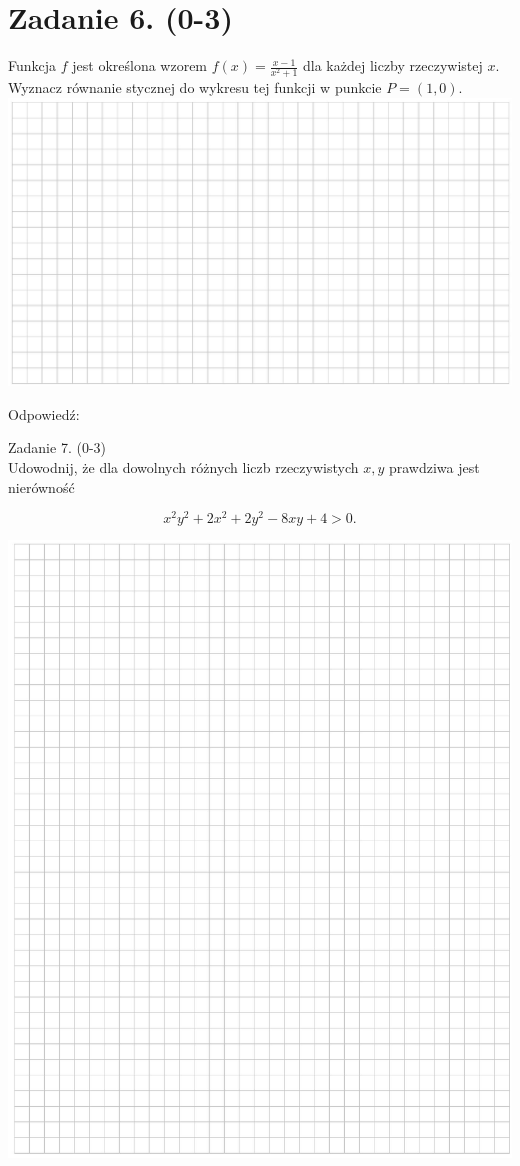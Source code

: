 \documentclass[10pt]{article}
\begin{document}
\section*{Zadanie 6. (0-3)}
Funkcja \(f\) jest określona wzorem \(f(x)=\frac{x-1}{x^{2}+1}\) dla każdej liczby rzeczywistej \(x\). Wyznacz równanie stycznej do wykresu tej funkcji w punkcie \(P=(1,0)\).\\
\includegraphics[max width=\textwidth, center]{2024_11_21_3120cbc7edd07b3a101fg-04(1)}

Odpowiedź: \(\qquad\)

Zadanie 7. (0-3)\\
Udowodnij, że dla dowolnych różnych liczb rzeczywistych \(x, y\) prawdziwa jest nierówność

\[
x^{2} y^{2}+2 x^{2}+2 y^{2}-8 x y+4>0 .
\]

\begin{center}
\includegraphics[max width=\textwidth]{2024_11_21_3120cbc7edd07b3a101fg-05}
\end{center}
\end{document}

